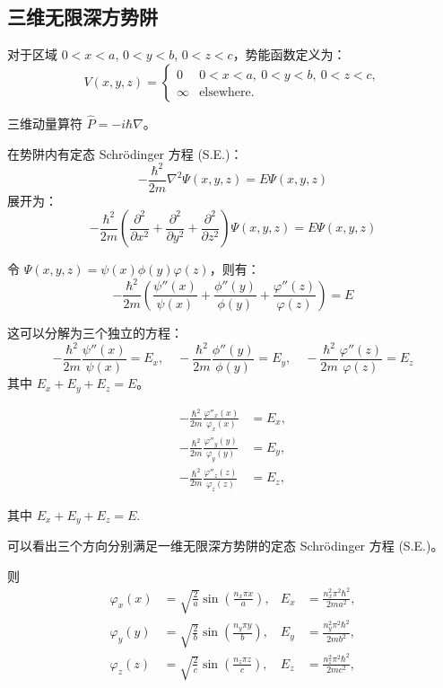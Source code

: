 \documentclass[lang=cn,10pt]{elegantbook}
\begin{document}
\subsection{三维无限深方势阱}
对于区域 $0 < x < a$, $0 < y < b$, $0 < z < c$，势能函数定义为：
\[
V(x,y,z) = 
\begin{cases} 
		0 & 0<x<a,\ 0<y<b,\ 0<z<c, \\
		\infty & \text{elsewhere.}
\end{cases}
\]

三维动量算符 $\hat{P} = -i\hbar\nabla$。

在势阱内有定态 Schrödinger 方程 (S.E.)：
\[
-\frac{\hbar^2}{2m} \nabla^2 \Psi(x,y,z) = E \Psi(x,y,z)
\]
展开为：
\[
-\frac{\hbar^2}{2m} \left( \frac{\partial^2}{\partial x^2} + \frac{\partial^2}{\partial y^2} + \frac{\partial^2}{\partial z^2} \right) \Psi(x,y,z) = E \Psi(x,y,z)
\]

令 $\Psi(x,y,z) = \psi(x) \phi(y) \varphi(z)$，则有：
\[
-\frac{\hbar^2}{2m} \left( \frac{\psi''(x)}{\psi(x)} + \frac{\phi''(y)}{\phi(y)} + \frac{\varphi''(z)}{\varphi(z)} \right) = E
\]

这可以分解为三个独立的方程：
\[
-\frac{\hbar^2}{2m} \frac{\psi''(x)}{\psi(x)} = E_x, \quad -\frac{\hbar^2}{2m} \frac{\phi''(y)}{\phi(y)} = E_y, \quad -\frac{\hbar^2}{2m} \frac{\varphi''(z)}{\varphi(z)} = E_z
\]
其中 $E_x + E_y + E_z = E$。


\begin{align*}
		-\frac{\hbar^2}{2m} \frac{\varphi''_x(x)}{\varphi_x(x)} &= E_x, \\
		-\frac{\hbar^2}{2m} \frac{\varphi''_y(y)}{\varphi_y(y)} &= E_y, \\
		-\frac{\hbar^2}{2m} \frac{\varphi''_z(z)}{\varphi_z(z)} &= E_z,
\end{align*}

其中 $E_x + E_y + E_z = E$.

可以看出三个方向分别满足一维无限深方势阱的定态 Schrödinger 方程 (S.E.)。

则
\begin{align*}
	\varphi_x(x) &= \sqrt{\frac{2}{a}} \sin\left(\frac{n_x \pi x}{a}\right), & E_x &= \frac{n_x^2 \pi^2 \hbar^2}{2ma^2}, \\
	\varphi_y(y) &= \sqrt{\frac{2}{b}} \sin\left(\frac{n_y \pi y}{b}\right), & E_y &= \frac{n_y^2 \pi^2 \hbar^2}{2mb^2}, \\
	\varphi_z(z) &= \sqrt{\frac{2}{c}} \sin\left(\frac{n_z \pi z}{c}\right), & E_z &= \frac{n_z^2 \pi^2 \hbar^2}{2mc^2},
\end{align*}
\end{document}
